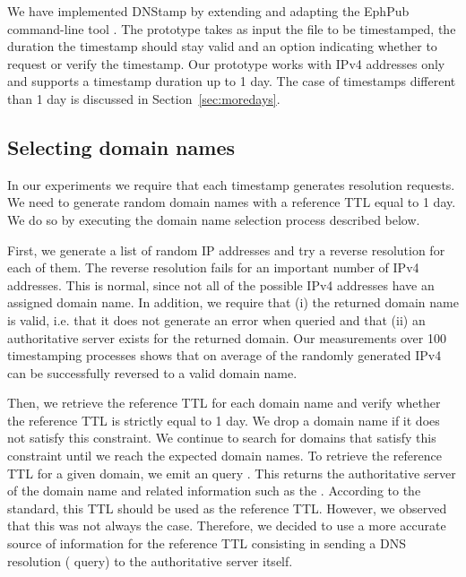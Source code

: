 \label{sec:implem}

We have implemented DNStamp by extending and adapting the EphPub command-line tool \cite{Castelluccia2011}. The prototype takes as input the file to be timestamped, the duration the timestamp should stay valid and an option indicating whether to request or verify the timestamp. Our prototype works with IPv4 addresses only and supports a timestamp duration up to 1 day. The case of timestamps
different than 1 day is discussed in Section~\ref{sec:moredays}.

\subsection{Selecting domain names}
\label{sec:domainselection}

In our experiments we require that each timestamp generates  resolution requests. We need to generate  random domain names with a reference TTL equal to 1 day. We do so by executing the domain name selection process described below.

First, we generate a list of random IP addresses and try a reverse resolution for each of them. The reverse resolution fails for an important number of IPv4 addresses. This is normal, since not all of the possible IPv4 addresses have an assigned domain name. In addition, we require that (i) the returned domain name is valid, i.e. that it does not generate an  error \cite{Mockapetris1987} when queried and that (ii) an authoritative server exists for the returned domain. Our measurements over 100 timestamping processes shows that on average  of the randomly generated IPv4 can be successfully reversed to a valid domain name.

Then, we retrieve the reference TTL for each domain name and verify whether the reference TTL is strictly equal to 1 day. We drop a domain name if it does not satisfy this constraint. We continue to search for domains that satisfy this constraint until we reach the  expected domain names.
To retrieve the reference TTL for a given domain, we emit an  query \cite{Mockapetris1987}. This returns the authoritative server of the domain name and related information such as the . According to the standard, this TTL should be used as the reference TTL. However, we observed that this was not always the case. Therefore, we decided to use a more accurate source of information for the reference TTL consisting in sending a DNS resolution ( query) to the authoritative server itself. 

